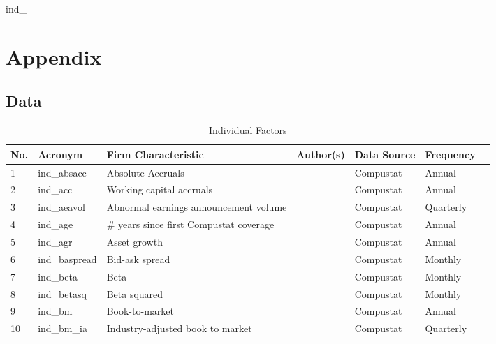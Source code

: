 \documentclass[a4paper, table]{article}
\begin{document}
ind\_

\section{Appendix}

\subsection{Data}


\begin{landscape}
	\begin{center}
		\label{ind_factors}
		\begin{longtable}{lllllll}
			\caption{Individual Factors} \\ \hline
			No. & Acronym & Firm Characteristic & Author(s) & Data Source & Frequency \\ \hline
			1 & ind\_absacc\footnotemark[\value{footnote}] & Absolute Accruals & 
				\cite{bandyopadhyay_accrual_2010} & Compustat & Annual \\
			2 & ind\_acc\footnotemark[\value{footnote}] & Working capital accruals & 
				\cite{sloan_stock_1996} & Compustat & Annual \\
			3 & ind\_aeavol & Abnormal earnings announcement volume & 
				\cite{lerman_high-volume_2008} & Compustat & Quarterly \\
			4 & ind\_age & \# years since first Compustat coverage & 
				\cite{jiang_information_2005} & Compustat & Annual \\
			5 & ind\_agr & Asset growth & 
				\cite{cooper_asset_2008} & Compustat & Annual \\
			6 & ind\_baspread & Bid-ask spread & 
				\cite{amihud_effects_1989} & Compustat & Monthly \\
			7 & ind\_beta & Beta & 
				\cite{fama_risk_1973} & Compustat & Monthly \\
			8 & ind\_betasq & Beta squared & 
				\cite{fama_risk_1973} & Compustat & Monthly \\
			9 & ind\_bm & Book-to-market & 
				\cite{rosenberg_persuasive_1985} & Compustat & Annual \\
			10 & ind\_bm\_ia & Industry-adjusted book to market & 
				\cite{asness_predicting_2000} & Compustat & Quarterly \\

\end{longtable}
\end{center}
\end{landscape}
\end{document}
